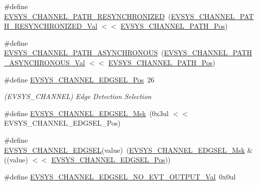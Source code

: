 \begin{DoxyCompactItemize}
\item 
\#define \mbox{\hyperlink{group___s_a_m_d21___e_v_s_y_s_ga1c73b14174899488574ae0456c40ce10}{E\+V\+S\+Y\+S\+\_\+\+C\+H\+A\+N\+N\+E\+L\+\_\+\+P\+A\+T\+H\+\_\+\+R\+E\+S\+Y\+N\+C\+H\+R\+O\+N\+I\+Z\+ED}}~(\mbox{\hyperlink{group___s_a_m_d21___e_v_s_y_s_gaeb385f0d13f51660c582fb7e8d5a753a}{E\+V\+S\+Y\+S\+\_\+\+C\+H\+A\+N\+N\+E\+L\+\_\+\+P\+A\+T\+H\+\_\+\+R\+E\+S\+Y\+N\+C\+H\+R\+O\+N\+I\+Z\+E\+D\+\_\+\+Val}} $<$$<$ \mbox{\hyperlink{group___s_a_m_d21___e_v_s_y_s_ga1c99b6755155dc2b405c63587973570b}{E\+V\+S\+Y\+S\+\_\+\+C\+H\+A\+N\+N\+E\+L\+\_\+\+P\+A\+T\+H\+\_\+\+Pos}})
\item 
\#define \mbox{\hyperlink{group___s_a_m_d21___e_v_s_y_s_ga6bc286e48c7fe4e5281967d955a29968}{E\+V\+S\+Y\+S\+\_\+\+C\+H\+A\+N\+N\+E\+L\+\_\+\+P\+A\+T\+H\+\_\+\+A\+S\+Y\+N\+C\+H\+R\+O\+N\+O\+US}}~(\mbox{\hyperlink{group___s_a_m_d21___e_v_s_y_s_gae66529525c793ce0b4621730bd6d5944}{E\+V\+S\+Y\+S\+\_\+\+C\+H\+A\+N\+N\+E\+L\+\_\+\+P\+A\+T\+H\+\_\+\+A\+S\+Y\+N\+C\+H\+R\+O\+N\+O\+U\+S\+\_\+\+Val}} $<$$<$ \mbox{\hyperlink{group___s_a_m_d21___e_v_s_y_s_ga1c99b6755155dc2b405c63587973570b}{E\+V\+S\+Y\+S\+\_\+\+C\+H\+A\+N\+N\+E\+L\+\_\+\+P\+A\+T\+H\+\_\+\+Pos}})
\item 
\#define \mbox{\hyperlink{group___s_a_m_d21___e_v_s_y_s_ga940ccedfddf915a4532da9b752cab3a0}{E\+V\+S\+Y\+S\+\_\+\+C\+H\+A\+N\+N\+E\+L\+\_\+\+E\+D\+G\+S\+E\+L\+\_\+\+Pos}}~26
\begin{DoxyCompactList}\small\item\em (E\+V\+S\+Y\+S\+\_\+\+C\+H\+A\+N\+N\+EL) Edge Detection Selection \end{DoxyCompactList}\item 
\#define \mbox{\hyperlink{group___s_a_m_d21___e_v_s_y_s_gaf603adba0ca49498f9d62deee0243386}{E\+V\+S\+Y\+S\+\_\+\+C\+H\+A\+N\+N\+E\+L\+\_\+\+E\+D\+G\+S\+E\+L\+\_\+\+Msk}}~(0x3ul $<$$<$ E\+V\+S\+Y\+S\+\_\+\+C\+H\+A\+N\+N\+E\+L\+\_\+\+E\+D\+G\+S\+E\+L\+\_\+\+Pos)
\item 
\#define \mbox{\hyperlink{group___s_a_m_d21___e_v_s_y_s_ga72823da9c6e8d38007ac9b0eec58d10f}{E\+V\+S\+Y\+S\+\_\+\+C\+H\+A\+N\+N\+E\+L\+\_\+\+E\+D\+G\+S\+EL}}(value)~(\mbox{\hyperlink{group___s_a_m_d21___e_v_s_y_s_gaf603adba0ca49498f9d62deee0243386}{E\+V\+S\+Y\+S\+\_\+\+C\+H\+A\+N\+N\+E\+L\+\_\+\+E\+D\+G\+S\+E\+L\+\_\+\+Msk}} \& ((value) $<$$<$ \mbox{\hyperlink{group___s_a_m_d21___e_v_s_y_s_ga940ccedfddf915a4532da9b752cab3a0}{E\+V\+S\+Y\+S\+\_\+\+C\+H\+A\+N\+N\+E\+L\+\_\+\+E\+D\+G\+S\+E\+L\+\_\+\+Pos}}))
\item 
\#define \mbox{\hyperlink{group___s_a_m_d21___e_v_s_y_s_ga80b0403aa00907e545ba1ce27a55b03a}{E\+V\+S\+Y\+S\+\_\+\+C\+H\+A\+N\+N\+E\+L\+\_\+\+E\+D\+G\+S\+E\+L\+\_\+\+N\+O\+\_\+\+E\+V\+T\+\_\+\+O\+U\+T\+P\+U\+T\+\_\+\+Val}}~0x0ul

\end{DoxyCompactItemize}
